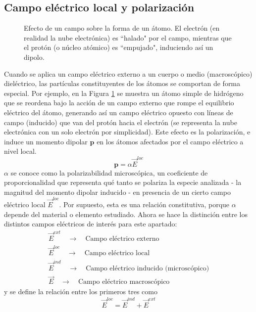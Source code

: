 \documentclass[12pt, oneside, numbers, spanish]{ezthesis}
\numberwithin{equation}{section}
\begin{document}
\subsection{Campo eléctrico local y polarización}\label{subsec:Local_Field}
\begin{figure}[H]
\centering

\caption{Efecto de un campo sobre la forma de un átomo. El electrón (en realidad la nube electrónica) es ``halado" por el campo, mientras que el protón (o núcleo atómico) es ``empujado", induciendo así un dipolo.}
\label{fig:Polarization}
\end{figure}
Cuando se aplica un campo eléctrico externo a un cuerpo o medio (macroscópico) dieléctrico, las partículas constituyentes de los átomos se comportan de forma especial. Por ejemplo, en la Figura \ref{fig:Polarization} se muestra un átomo simple de hidrógeno que se reordena bajo la acción de un campo externo que rompe el equilibrio eléctrico del átomo, generando así un campo eléctrico opuesto con líneas de campo (inducido) que van del protón hacia el electrón (se representa la nube electrónica con un solo electrón por simplicidad). Este efecto es la polarización, e induce un momento dipolar $\mathbf{p}$ en los átomos afectados por el campo eléctrico a nivel local.
\begin{equation}
\mathbf{p} = \alpha\vec{E}^{loc}
\end{equation}
$\alpha$ se conoce como la polarizabilidad microscópica, un coeficiente de proporcionalidad que representa qué tanto se polariza la especie analizada - la magnitud del momento dipolar inducido - en presencia de un cierto campo eléctrico local $\vec{E}^{loc}$. Por supuesto, esta es una relación constitutiva, porque $\alpha$ depende del material o elemento estudiado. Ahora se hace la distinción entre los distintos campos eléctricos de interés para este apartado:
\begin{gather*}
\vec{E}^{ext} \quad \longrightarrow \quad \text{Campo eléctrico externo}\\
\vec{E}^{loc} \quad \longrightarrow \quad \text{Campo eléctrico local}\\
\vec{E}^{ind} \quad \longrightarrow \quad \text{Campo eléctrico inducido (microscópico)}\\
\vec{E} \quad \longrightarrow \quad \text{Campo eléctrico macroscópico}
\end{gather*}
y se define la relación entre los primeros tres como
\begin{equation}
\vec{E}^{loc} = \vec{E}^{ind} + \vec{E}^{ext}
\end{equation}
\end{document}
